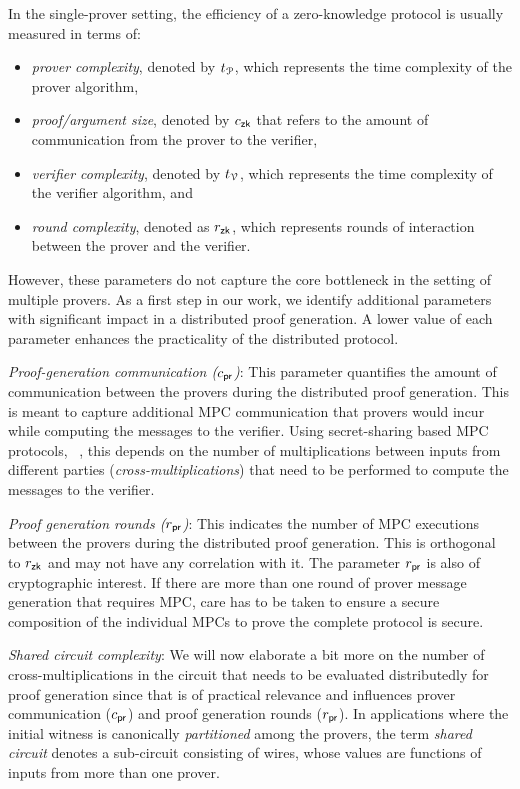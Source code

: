 In the single-prover setting, the efficiency of a zero-knowledge protocol is usually measured in terms of: 
\begin{itemize}
	\item {\em prover complexity}, denoted by $t_{\mathcal{P}}$, which represents the time complexity of the prover algorithm,
	\item {\em proof/argument size}, denoted by $c_\mathsf{zk}$ that refers to the amount of communication from the prover to the verifier,
	\item {\em verifier complexity}, denoted by $t_{\mathcal{V}}$, which represents the time complexity of the verifier algorithm, and
	\item {\em round complexity}, denoted as $r_\mathsf{zk}$, which represents rounds of interaction between the prover and the verifier. 
\end{itemize} 
However, these parameters do not capture the core bottleneck in the setting of multiple provers.
As a first step in our work, we identify additional parameters with significant impact in a distributed proof generation. A lower value of each parameter enhances the practicality of the distributed protocol.

\noindent\textit{Proof-generation communication ($c_\mathsf{pr}$)}:
This parameter quantifies the amount of communication between the provers during the distributed proof generation. 
This is meant to capture additional MPC communication that provers would incur while computing the messages to the verifier. 
Using secret-sharing based MPC protocols, ~\cite{GMW87, BGW88, SPDZ}, this depends on the number of multiplications between inputs 
from different parties ({\em cross-multiplications}) that need to be performed to compute the messages to the verifier. 


\noindent\textit{Proof generation rounds ($r_\mathsf{pr}$)}:
This indicates the number of MPC executions between the provers during the distributed proof generation. 
This is orthogonal to $r_\mathsf{zk}$ and may not have any correlation with it. 
The parameter $r_\mathsf{pr}$ is also of cryptographic interest. If there are more than one round of prover message generation that requires MPC, care has to be taken to ensure a secure composition of the individual MPCs to prove the complete protocol is secure.

\noindent\textit{Shared circuit complexity}:
We will now elaborate a bit more on the number of cross-multiplications in the circuit that needs to be evaluated distributedly for proof generation since
that is of practical relevance and influences prover communication ($c_\mathsf{pr}$)
and proof generation rounds ($r_\mathsf{pr}$). In applications where the initial witness is canonically \textit{partitioned} among the provers,  the term \textit{shared circuit} denotes a sub-circuit consisting of wires, whose values are functions of inputs from more than one prover. 

